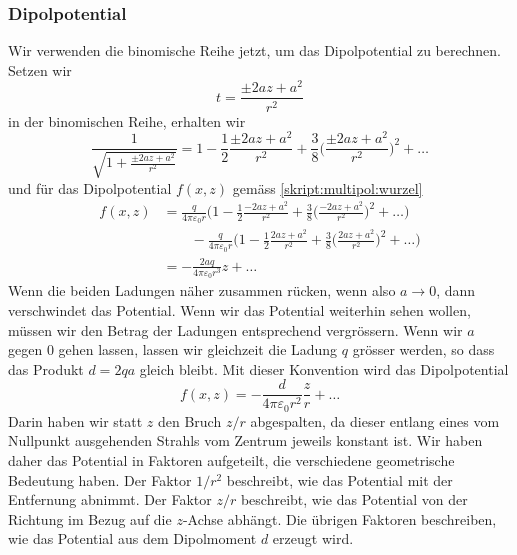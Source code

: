 \subsubsection{Dipolpotential}
Wir verwenden die binomische Reihe jetzt, um das Dipolpotential
zu berechnen.
Setzen wir 
\[
t=\frac{\pm 2az+a^2}{r^2}
\]
in der binomischen Reihe, erhalten wir
\[
\frac{1}{\sqrt{1+\frac{\pm 2az+a^2}{r^2}}}
=
1-\frac12\frac{\pm 2az+a^2}{r^2}
+
\frac38 \biggl(\frac{\pm 2az+a^2}{r^2}\biggr)^2+\dots
\]
und für das Dipolpotential $f(x,z)$ gemäss \eqref{skript:multipol:wurzel}
\begin{align*}
f(x,z)
&=
\frac{q}{4\pi\varepsilon_0 r}
\biggl(
1-\frac12\frac{-2az+a^2}{r^2} + \frac38 \biggl(\frac{-2az+a^2}{r^2}\biggr)^2+\dots
\biggr)
\\
&\qquad
-
\frac{q}{4\pi\varepsilon_0 r}
\biggl(
1-\frac12\frac{2az+a^2}{r^2} + \frac38 \biggl(\frac{2az+a^2}{r^2}\biggr)^2+\dots
\biggr)
\\
&=
-\frac{2aq}{4\pi\varepsilon_0r^3}z + \dots
\end{align*}
Wenn die beiden Ladungen näher zusammen rücken, wenn also $a\to 0$,
dann verschwindet das Potential.
Wenn wir das Potential weiterhin sehen wollen, müssen wir den Betrag
der Ladungen entsprechend vergrössern.
Wenn wir $a$ gegen $0$ gehen lassen, lassen wir gleichzeit die Ladung
$q$ grösser werden, so dass das Produkt $d=2qa$ gleich bleibt.
Mit dieser Konvention wird das Dipolpotential
\begin{equation}
f(x,z) = -\frac{d}{4\pi\varepsilon_0 r^2}\frac{z}{r}+\dots
\label{skript:multipol:dipolpotential}
\end{equation}
Darin haben wir statt $z$ den Bruch $z/r$ abgespalten, da dieser
entlang eines vom Nullpunkt ausgehenden Strahls vom Zentrum jeweils
konstant ist.
Wir haben daher das Potential in Faktoren aufgeteilt, die verschiedene
geometrische Bedeutung haben.
Der Faktor $1/r^2$ beschreibt, wie das Potential mit der Entfernung abnimmt.
Der Faktor $z/r$ beschreibt, wie das Potential von der Richtung im
Bezug auf die $z$-Achse abhängt.
Die übrigen Faktoren beschreiben, wie das Potential aus dem Dipolmoment
$d$ erzeugt wird.


